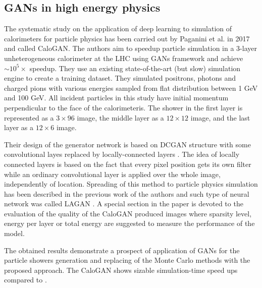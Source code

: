 \subsection{GANs in high energy physics}
The  systematic study on the application of deep learning to simulation of calorimeters for particle physics has been carried out by Paganini et al. in 2017 \cite{paganini2017calogan} and called CaloGAN. The authors aim to speedup particle simulation in a 3-layer unheterogeneous calorimeter at the LHC using GANs framework and achieve $\sim 10^5 \times$ speedup. They use an existing state-of-the-art (but slow) simulation engine \geant to create a training dataset. They simulated positrons, photons and charged pions with various energies sampled from flat distribution between 1 GeV and 100 GeV. All incident particles in this study have initial momentum perpendicular to the face of the calorimeteris. The shower in the first layer is represented as a $3 \times 96$ image, the middle layer as a $12 \times 12$ image, and the last layer as a $12 \times 6$ image. 

Their design of the generator network is based on DCGAN structure \cite{radford2015unsupervised} with some convolutional layes replaced by locally-connected layers \cite{taigman2014deepface}. The idea of locally connected layers is based on the fact that every pixel position gets its own filter while an ordinary convolutional layer is applied over the whole image, independently of location. Spreading of this method to particle physics simulation has been described in the previous work of the authors and such type of neural network was called LAGAN \cite{de2017learning}. A special section in the paper is devoted to the evaluation of the quality of the CaloGAN produced images where  sparsity level,  energy per layer or total energy are suggested to measure the performance of the model. 

The obtained results demonstrate a prospect of application of GANs for the particle showers generation and replacing of the Monte Carlo methods with the proposed approach. The CaloGAN shows sizable simulation-time speed ups compared to \geant. 

